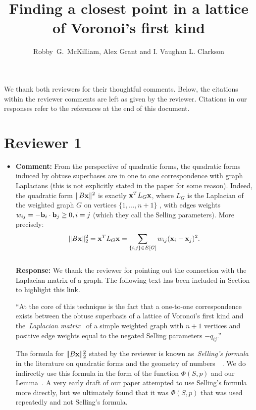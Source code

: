 \documentclass[a4paper,10pt]{article}
\title{Finding a closest point in a lattice of Voronoi's first kind}
\author{Robby~G.~McKilliam, Alex Grant and I. Vaughan L. Clarkson
}
\begin{document}
\maketitle

We thank both reviewers for their thoughtful comments.  Below, the citations within the reviewer comments are left as given by the reviewer.  Citations in our responses refer to the references at the end of this document.


\section*{Reviewer 1}\label{sec:reviewer-1}

\begin{itemize}

\item\textbf{Comment:} 
From the perspective of quadratic forms, the quadratic forms induced by obtuse superbases are in one to one correspondence with graph Laplacians (this is not
explicitly stated in the paper for some reason). Indeed, the quadratic form $\|B\mathbf{x}\|^2$ is exactly $\mathbf{x}^T L_G \mathbf{x}$, where $L_G$ is the Laplacian of the weighted graph $G$ on vertices $\{ 1, . . . , n + 1 \}$ , with edges weights $w_{ij} = -\mathbf{b}_i \cdot \mathbf{b}_j \geq 0, i = j$ (which they call the Selling parameters). More precisely:
\[
\|B\mathbf{x}\|_2^2 = \mathbf{x}^T L_G \mathbf{x} = \sum_{ \{i,j\} \in E[G] } w_{ij} (\mathbf{x}_{i} - \mathbf{x}_{j} )^2.
\]
\\ \textbf{Response:} We thank the reviewer for pointing out the connection with the Laplacian matrix of a graph.  The following text has been included in Section~ to highlight this link.

``At the core of this technique is the fact that a one-to-one correspondence exists between the obtuse superbasis of a lattice of Voronoi's first kind and the~\emph{Laplacian matrix}~\cite{Chung_spectral_graph_theory_1997,Cvetković_spectra_graphs_1998} of a simple weighted graph with $n+1$ vertices and positive edge weights equal to the negated Selling parameters $-q_{ij}$.''

The formula for $\|B\mathbf{x}\|_2^2$ stated by the reviewer is known as~\emph{Selling's formula} in the literature on quadratic forms and the geometry of numbers~\cite[Proposition 2.3.1]{Valentin2003_coverings_tilings_low_dimension}~\cite{Selling1874}.  We do indirectly use this formula in the form of the function $\Phi(S,p)$ and our Lemma~.  A very early draft of our paper attempted to use Selling's formula more directly, but we ultimately found that it was $\Phi(S,p)$ that was used repeatedly and not Selling's formula.


\end{itemize}
\end{document}
